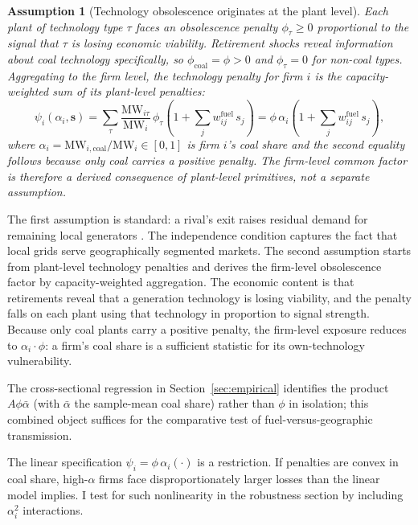 \documentclass[12pt,a4paper]{article}
\newtheorem{assumption}{Assumption}
\begin{document}
\begin{assumption}[Technology obsolescence originates at the plant level]\label{ass:obsolescence}
    Each plant of technology type $\tau$ faces an obsolescence penalty $\phi_\tau \geq 0$ proportional to the signal that $\tau$ is losing economic viability. Retirement shocks reveal information about coal technology specifically, so $\phi_{\mathrm{coal}} = \phi > 0$ and $\phi_\tau = 0$ for non-coal types. Aggregating to the firm level, the technology penalty for firm $i$ is the capacity-weighted sum of its plant-level penalties:
    \begin{equation}\label{eq:obsolescence}
        \psi_i(\alpha_i, \mathbf{s}) = \sum_\tau \frac{\mathrm{MW}_{i\tau}}{\mathrm{MW}_i}\,\phi_\tau \left(1 + \sum_{j} w^{\mathrm{fuel}}_{ij}\, s_j\right) = \phi\,\alpha_i\!\left(1 + \sum_{j} w^{\mathrm{fuel}}_{ij}\, s_j\right),
    \end{equation}
    where $\alpha_i = \mathrm{MW}_{i,\mathrm{coal}} / \mathrm{MW}_i \in [0,1]$ is firm $i$'s coal share and the second equality follows because only coal carries a positive penalty. The firm-level common factor is therefore a derived consequence of plant-level primitives, not a separate assumption.
\end{assumption}

The first assumption is standard: a rival's exit raises residual demand for remaining local generators \citep{DavisHausman2016}. The independence condition captures the fact that local grids serve geographically segmented markets. The second assumption starts from plant-level technology penalties and derives the firm-level obsolescence factor by capacity-weighted aggregation. The economic content is that retirements reveal that a generation technology is losing viability, and the penalty falls on each plant using that technology in proportion to signal strength. Because only coal plants carry a positive penalty, the firm-level exposure reduces to $\alpha_i \cdot \phi$: a firm's coal share is a sufficient statistic for its own-technology vulnerability.

The cross-sectional regression in Section~\ref{sec:empirical} identifies the product $A\phi\bar\alpha$ (with $\bar\alpha$ the sample-mean coal share) rather than $\phi$ in isolation; this combined object suffices for the comparative test of fuel-versus-geographic transmission.

The linear specification $\psi_i = \phi\,\alpha_i(\cdot)$ is a restriction. If penalties are convex in coal share, high-$\alpha$ firms face disproportionately larger losses than the linear model implies. I test for such nonlinearity in the robustness section by including $\alpha_i^2$ interactions.
\end{document}
